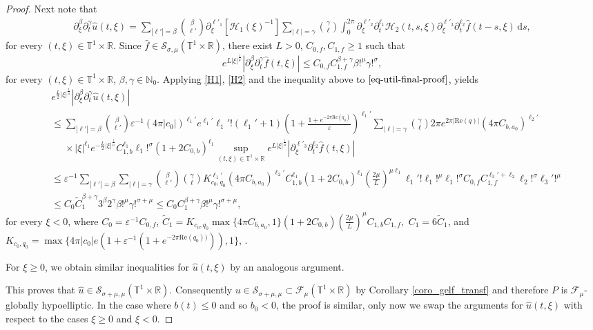 \documentclass[11pt,reqno]{amsart}
\numberwithin{equation}{section}
\theoremstyle{definition}
\theoremstyle{definition}
\newcommand{\T}{\mathbb{T}}
\newcommand{\G}{\mathnormal{\mathbb{T}^{m}\times\mathbb{R}^n}}
\newcommand{\R}{\mathbb{R}}
\newcommand{\N}{\mathbb{N}}
\newcommand{\s}{\mathcal{S}(\G)}
\newcommand{\g}{\mathbb{T}^1\times\mathbb{R}}
\newcommand{\Real}{\mathrm{Re}}
\renewcommand{\s}{\mathcal{S}_{\sigma,\mu}(\T^1\times\R)}
\newcommand{\Smu}{\mathscr{F}_{\mu}(\T^1\times\R)}
\begin{document}
\begin{proof}
Next note that
\begin{align}\label{eq-util-final-proof}
    \partial_\xi^\beta\partial_t^{\gamma}\widehat{u}(t,\xi)=\sum_{|\ell'|=\beta} \binom{\beta}{\ell'}\partial_\xi^{\ell'_1}[\mathcal{H}_1(\xi)^{-1}]\sum_{|\ell|=\gamma}\binom{\gamma}{\ell}\int_0^{2\pi}\partial_\xi^{\ell'_2}\partial_t^{\ell_1}\mathcal{H}_2(t,s,\xi)\partial_\xi^{\ell'_3}\partial_t^{\ell_2}\widehat{f}(t-s,\xi)\,\mathrm{d}s,
\end{align}
for every $(t,\xi)\in\T^1\times\R$. Since $\widehat{f}\in\s$, there exist $L>0$, $C_{0,f},C_{1,f}\geq 1$ such that
\begin{equation*}
    e^{L|\xi|^{\frac{1}{\mu}}}|\partial_\xi^\beta\partial_t^\gamma \widehat{f}(t,\xi)|\leq C_{0,f}C_{1,f}^{\beta+\gamma}\beta!^\mu\gamma!^\sigma,
\end{equation*}
for every $(t,\xi)\in\T^1\times\R$, $\beta,\gamma\in\N_0$.
Applying \eqref{H1}, \eqref{H2} and the inequality above to $\eqref{eq-util-final-proof}$, yields
\begin{align*}
    &e^{\frac{L}{2}|\xi|^{\frac{1}{\mu}}}|\partial_\xi^\beta\partial_t^{\gamma}\widehat{u}(t,\xi)|\\
    &\leq \sum_{|\ell'|=\beta} \binom{\beta}{\ell'}\varepsilon^{-1}(4\pi |c_0|)^{\ell_1'} e^{\ell_1'} \ell_1'!(\ell_1'+1)\left(1+\frac{1+e^{-2\pi  \Real(q_0)}}{\varepsilon}\right)^{\ell_1'}\sum_{|\ell|=\gamma}\binom{\gamma}{\ell}2\pi e^{2\pi|\Real(q)|}(4\pi C_{b,a_0})^{\ell_2'}\\
    & \phantom{\leq} \times |\xi|^{\ell_1}e^{-\frac{L}{2}|\xi|^{\frac{1}{\mu}}}C_{1,b}^{\ell_1}\ell_1!^\sigma (1+2C_{0,b})^{\ell_1}  \sup_{(t,\xi)\in\g}e^{L|\xi|^{\frac{1}{\mu}}}|\partial_\xi^{\ell'_3}\partial_t^{\ell_2}\widehat{f}(t,\xi)|\\
    &\leq \varepsilon^{-1} \sum_{|\ell'|=\beta} \sum_{|\ell|=\gamma}\binom{\beta}{\ell'}\binom{\gamma}{\ell}K_{c_0,q_0}^{\ell_1'}
    (4\pi C_{b,a_0})^{\ell_2'}C_{1,b}^{\ell_1} (1+2C_{0,b})^{\ell_1}\textstyle{(\frac{2\mu}{L})^{\mu\ell_1}}\ell_1'!\ell_1!^\mu\ell_1!^\sigma C_{0,f}C_{1,f}^{\ell_3'+\ell_2}\ell_2!^{\sigma}\ell_3'!^\mu\\
    &\leq C_0 \tilde{C}_{1}^{\beta+\gamma} 3^\beta 2^\gamma \beta!^{\mu}\gamma!^{\sigma+\mu}\leq C_0C_1^{\beta+\gamma}\beta!^\mu\gamma!^{\sigma+\mu},
\end{align*}
for every $\xi<0$, where $C_0=\varepsilon^{-1}C_{0,f}$, $\tilde{C}_1=K_{c_0,q_0}\max\{4\pi C_{b,a_0},1\}(1+2C_{0,b})(\frac{2\mu}{L})^\mu C_{1,b}C_{1,f},$ $C_1=6\tilde{C}_1$, and $K_{c_0,q_0}= \max\{4\pi|c_0|e\left(1+\varepsilon^{-1}\left(1+e^{-2\pi  \Real(q_0))}\right)\right),1\}$, .

For $\xi\geq0$, we obtain similar inequalities for $\widehat{u}(t,\xi)$ by an analogous argument. 

This proves that $\widehat{u}\in \mathcal{S}_{\sigma+\mu,\mu}(\g)$.  Consequently $u\in\mathcal{S}_{\sigma+\mu,\mu}\subset  \Smu$ by Corollary \ref{coro_gelf_transf} and therefore $P$ is $\mathscr{F}_{\mu}$-globally hypoelliptic. In the case where $b(t)\leq 0$ and so $b_0<0$, the proof is similar, only now we swap the arguments for $\widehat{u}(t,\xi)$ with respect to the cases $\xi\geq 0$ and $\xi<0$.
\end{proof}
\end{document}
